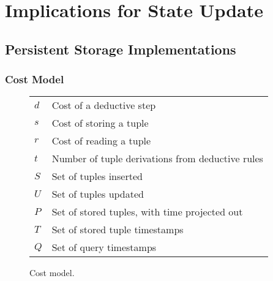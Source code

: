 \section{Implications for State Update}



\subsection{Persistent Storage Implementations}



\subsubsection{Cost Model}

\begin{figure}[t]
\begin{tabular}{ll} \hline
$d$ & Cost of a deductive step \\
$s$ & Cost of storing a tuple \\
$r$ & Cost of reading a tuple \\ 
$t$ & Number of tuple derivations from deductive rules \\ 
\hline
$S$ & Set of tuples inserted \\
$U$ & Set of tuples updated \\
$P$ & Set of stored tuples, with time projected out \\ 
$T$ & Set of stored tuple timestamps \\ 
$Q$ & Set of query timestamps \\ \hline 
\end{tabular}
\caption{Cost model.}
\label{fig:breakdown}
\end{figure}


